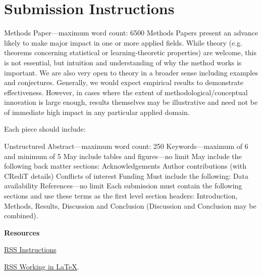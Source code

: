 \documentclass{article}
\begin{document}
\section{Submission Instructions}

Methods Paper—maximum word count: 6500
Methods Papers present an advance likely to make major impact in one or more applied
fields. While theory (e.g. theorems concerning statistical or
learning-theoretic properties) are welcome, this is not essential, but intuition and
understanding of why the method works is important.
We are also very open to theory in a broader sense including examples and conjectures.
Generally, we would expect empirical results to demonstrate effectiveness.
However, in cases where the extent of methodological/conceptual innovation is large
enough, results themselves may be illustrative and need not be of immediate high impact
in any particular applied domain.

Each piece should include:

Unstructured Abstract—maximum word count: 250
Keywords—maximum of 6 and minimum of 5
May include tables and figures—no limit
May include the following back matter sections:
Acknowledgements
Author contributions (with CRediT details)
Conflicts of interest
Funding
Must include the following:
Data availability
References—no limit
Each submission must contain the following sections and use these terms as the first
level section headers: Introduction, Methods, Results, Discussion and Conclusion
(Discussion and Conclusion may be combined).

{\bf Resources}

\href{https://academic.oup.com/rssdat/pages/general-instructions}{RSS Instructions} 

\href{https://academic.oup.com/pages/authoring/books/preparing-your-manuscript/working-in-latex}{RSS Working in \LaTeX}.


\end{document}
